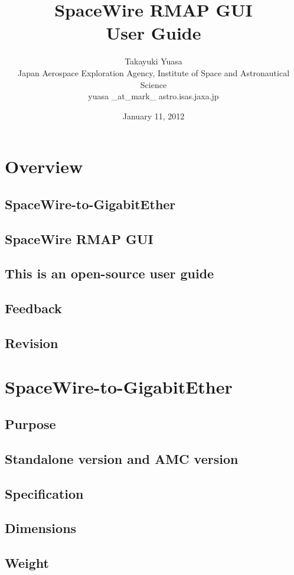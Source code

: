 \documentclass[a4paper,10pt]{article}
\title{\Huge{
SpaceWire RMAP GUI}\\
\Large{User Guide}}
\author{
{\Large
Takayuki Yuasa
}\\
{\small Japan Aerospace Exploration Agency, Institute of Space and Astronautical Science}\\
{\small yuasa \_at\_mark\_ astro.isas.jaxa.jp}\\
}
\date{January 11, 2012}
\begin{document}
\maketitle
\tableofcontents

\setcounter{page}{1}

\section{Overview}
\subsection{SpaceWire-to-GigabitEther}
\subsection{SpaceWire RMAP GUI}
\subsection{This is an open-source user guide}
\subsection{Feedback}
\subsection{Revision}

\section{SpaceWire-to-GigabitEther}
\subsection{Purpose}
\subsection{Standalone version and AMC version}
\subsection{Specification}
\subsection{Dimensions}
\subsection{Weight}
\end{document}
